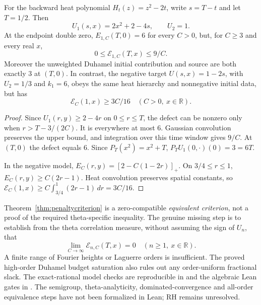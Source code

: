 \begin{proposition}
\label{prop:penalty-collision}
For the backward heat polynomial
$H_t(z)=z^2-2t$, write $s=T-t$
and let $T=1/2$. Then
\[
U_1(s,x)=2x^2+2-4s,\qquad U_2=1.
\]
At the endpoint double zero,
$E_{1,C}(T,0)=6$ for every $C>0$,
but, for $C\ge3$ and every real $x$,
\begin{equation}\label{eq:penalty-collision-rate}
0\le\mathcal E_{1,C}(T,x)\le9/C.
\end{equation}
Moreover the unweighted Duhamel
initial contribution and source
are both exactly $3$ at $(T,0)$.
In contrast, the negative target
$U(s,x)=1-2s$, with $U_2=1/3$
and $k_1=6$, obeys the same heat
hierarchy and nonnegative initial
data, but has
\begin{equation}
\mathcal E_C(1,x)\ge3C/16
\quad(C>0,\ x\in\mathbb R).
\label{eq:penalty-negative}
\end{equation}
\end{proposition}
\begin{proof}
Since $U_1(r,y)\ge2-4r$ on
$0\le r\le T$, the defect can
be nonzero only when
$r>T-3/(2C)$. It is everywhere
at most $6$. Gaussian convolution
preserves the upper bound, and
integration over this time window
gives $9/C$. At $(T,0)$ the
defect equals $6$. Since
$P_T(x^2)=x^2+T$,
$P_TU_1(0,\cdot)(0)=3=6T$.

In the negative model,
$E_C(r,y)=[2-C(1-2r)]_+$.
On $3/4\le r\le1$,
$E_C(r,y)\ge C(2r-1)$.
Heat convolution preserves
spatial constants, so
$\mathcal E_C(1,x)\ge
C\int_{3/4}^1(2r-1)\,dr=3C/16$.
\end{proof}

Theorem~\ref{thm:penaltycriterion} is a
zero-compatible \emph{equivalent
criterion}, not a proof of the
required theta-specific inequality.
The genuine missing step is to
establish from the theta correlation
measure, without assuming the sign
of $U_n$, that
\begin{equation}
\boxed{\lim_{C\to\infty}
\mathcal E_{n,C}(T,x)=0
\quad(n\ge1,\ x\in\mathbb R).}
\label{eq:penalty-missing}
\end{equation}
A finite range of Fourier heights
or Laguerre orders is insufficient.
The proved high-order Duhamel
budget saturation also rules out
any order-uniform fractional slack.
The exact-rational model checks
are reproducible in
and the algebraic Lean gates in
.
The semigroup, theta-analyticity,
dominated-convergence and
all-order equivalence steps
have not been formalized in Lean;
RH remains unresolved.
